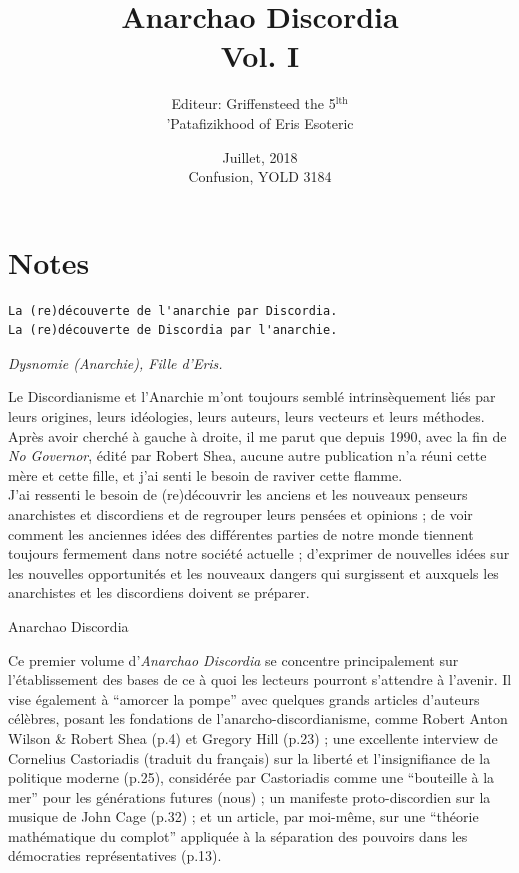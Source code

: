 \documentclass[12pt, onecolumn, letterpaper, oneside]{book}
\title{Anarchao Discordia\\
		\vspace{1\baselineskip}
		\large{Vol. I}
		}
\date{Juillet, 2018\\
		 Confusion, YOLD 3184}
\author{Editeur: Griffensteed the 5$^\text{lth}$\\
			'Patafizikhood of Eris Esoteric\\}
\begin{document}
\sloppy
 \renewcommand{\contentsname}{Sommaire}

\maketitle

\tableofcontents

\chapter*{Notes}
\begin{verbatim}
La (re)découverte de l'anarchie par Discordia.
La (re)découverte de Discordia par l'anarchie.        
\end{verbatim}

\begin{center}
\emph{Dysnomie (Anarchie), Fille d'Eris.}\\
\end{center}

Le Discordianisme et l'Anarchie m'ont toujours semblé intrinsèquement liés par leurs origines, leurs idéologies, leurs auteurs, leurs vecteurs et leurs méthodes. Après avoir cherché à gauche à droite, il me parut que depuis 1990, avec la fin de \emph{No Governor}, édité par Robert Shea, aucune autre publication n'a réuni cette mère et cette fille, et j'ai senti le besoin de raviver cette flamme.\\
J'ai ressenti le besoin de (re)découvrir les anciens et les nouveaux penseurs anarchistes et discordiens et de regrouper leurs pensées et opinions ; de voir comment les anciennes idées des différentes parties de notre monde tiennent toujours fermement dans notre société actuelle ; d'exprimer de nouvelles idées sur les nouvelles opportunités et les nouveaux dangers qui surgissent et auxquels les anarchistes et les discordiens doivent se préparer.\\

\begin{center}
Anarchao Discordia\\
\end{center}

Ce premier volume d'\emph{Anarchao Discordia} se concentre principalement sur l'établissement des bases de ce à quoi les lecteurs pourront s'attendre à l'avenir. Il vise également à ``amorcer la pompe'' avec quelques grands articles d'auteurs célèbres, posant les fondations de l'anarcho-discordianisme, comme Robert Anton Wilson \& Robert Shea (p.4) et Gregory Hill (p.23) ; une excellente interview de Cornelius Castoriadis (traduit du français) sur la liberté et l'insignifiance de la politique moderne (p.25), considérée par Castoriadis comme une ``bouteille à la mer'' pour les générations futures (nous) ; un manifeste proto-discordien sur la musique de John Cage (p.32) ; et un article, par moi-même, sur une ``théorie mathématique du complot'' appliquée à la séparation des pouvoirs dans les démocraties représentatives (p.13).\\
\end{document}
